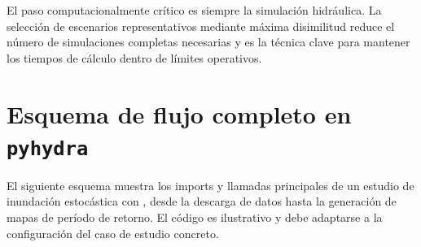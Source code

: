 El paso computacionalmente crítico es siempre la simulación hidráulica. La selección de escenarios representativos mediante máxima disimilitud reduce el número de simulaciones completas necesarias y es la técnica clave para mantener los tiempos de cálculo dentro de límites operativos.

\section{Esquema de flujo completo en \texttt{pyhydra}}
\label{app:flujo_completo}

El siguiente esquema muestra los imports y llamadas principales de un estudio de inundación estocástica con \pyhydra, desde la descarga de datos hasta la generación de mapas de período de retorno. El código es ilustrativo y debe adaptarse a la configuración del caso de estudio concreto.

